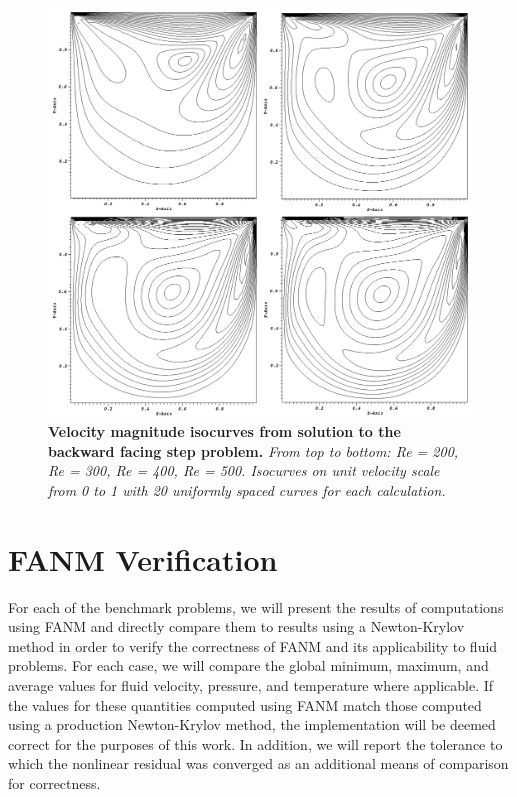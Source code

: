 \begin{figure}[t!]
  \begin{center}
    \includegraphics[width=6in]{chapters/nonlinear_problem/driven_velocity_isocurves.png}
  \end{center}
  \caption{\textbf{Velocity magnitude isocurves from solution to the
      backward facing step problem.} \textit{From top to bottom: Re =
      200, Re = 300, Re = 400, Re = 500. Isocurves on unit velocity
      scale from 0 to 1 with 20 uniformly spaced curves for each
      calculation.}}
  \label{fig:step_velocity_isocurves}
\end{figure}

\clearpage

\section{FANM Verification\ }
\label{sec:fanm_verification}

For each of the benchmark problems, we will present the results of
computations using FANM and directly compare them to results using a
Newton-Krylov method in order to verify the correctness of FANM and
its applicability to fluid problems. For each case, we will compare
the global minimum, maximum, and average values for fluid velocity,
pressure, and temperature where applicable. If the values for these
quantities computed using FANM match those computed using a production
Newton-Krylov method, the implementation will be deemed correct for
the purposes of this work. In addition, we will report the tolerance
to which the nonlinear residual was converged as an additional means
of comparison for correctness.

